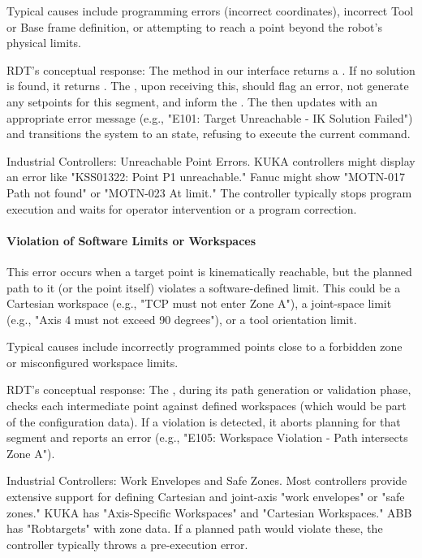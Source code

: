 Typical causes include programming errors (incorrect coordinates), incorrect Tool or Base frame definition, or attempting to reach a point beyond the robot's physical limits.

RDT's conceptual response: The  method in our  interface returns a . If no solution is found, it returns . The , upon receiving this, should flag an error, not generate any setpoints for this segment, and inform the . The  then updates  with an appropriate error message (e.g., "E101: Target Unreachable - IK Solution Failed") and transitions the system to an  state, refusing to execute the current command.

\begin{principlebox}{Industrial Controllers: Unreachable Point Errors.}
    KUKA controllers might display an error like "KSS01322: Point P1 unreachable." Fanuc might show "MOTN-017 Path not found" or "MOTN-023 At limit." The controller typically stops program execution and waits for operator intervention or a program correction.
\end{principlebox}

\paragraph{Violation of Software Limits or Workspaces}
This error occurs when a target point is kinematically reachable, but the planned path to it (or the point itself) violates a software-defined limit. This could be a Cartesian workspace (e.g., "TCP must not enter Zone A"), a joint-space limit (e.g., "Axis 4 must not exceed 90 degrees"), or a tool orientation limit.

Typical causes include incorrectly programmed points close to a forbidden zone or misconfigured workspace limits.

RDT's conceptual response: The , during its path generation or validation phase, checks each intermediate point against defined workspaces (which would be part of the configuration data). If a violation is detected, it aborts planning for that segment and reports an error (e.g., "E105: Workspace Violation - Path intersects Zone A").

\begin{principlebox}{Industrial Controllers: Work Envelopes and Safe Zones.}
    Most controllers provide extensive support for defining Cartesian and joint-axis "work envelopes" or "safe zones." KUKA has "Axis-Specific Workspaces" and "Cartesian Workspaces." ABB has "Robtargets" with zone data. If a planned path would violate these, the controller typically throws a pre-execution error.
\end{principlebox}


